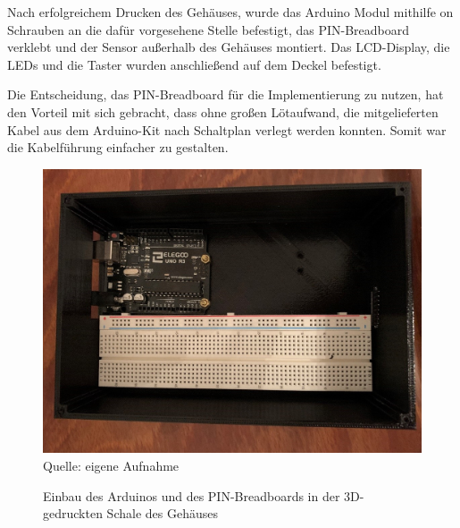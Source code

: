 \label{Hardwareimpl}

Nach erfolgreichem Drucken des Gehäuses, wurde das Arduino Modul mithilfe on Schrauben an die dafür vorgesehene Stelle befestigt, das PIN-Breadboard verklebt und der Sensor außerhalb des Gehäuses montiert. Das \ac{LCD}-Display, die \ac{LED}s und die Taster wurden anschließend auf dem Deckel befestigt.


Die Entscheidung, das PIN-Breadboard für die Implementierung zu nutzen, hat den Vorteil mit sich gebracht, dass ohne großen Lötaufwand, die mitgelieferten Kabel aus dem Arduino-Kit nach Schaltplan verlegt werden konnten. Somit war die Kabelführung einfacher zu gestalten.

\begin{figure}[!hbt]
	\centering
	\includegraphics[width=0.6\linewidth]{Images/Einbau_AuB}
	\footnotesize \\Quelle: eigene Aufnahme
	\caption{Einbau des Arduinos und des PIN-Breadboards in der 3D-gedruckten Schale des Gehäuses}
	\label{fig:Einbau_AuB}
\end{figure}
